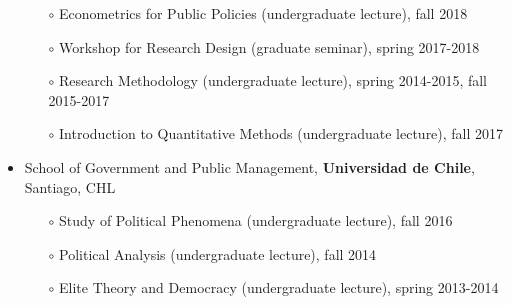 \begin{publications}
\begin{itemize}
\begin{itemize}
\item[$\circ$]{\small Econometrics for Public Policies (undergraduate lecture), fall 2018}
\item[$\circ$]{\small Workshop for Research Design (graduate seminar), spring 2017-2018}
\item[$\circ$]{\small Research Methodology (undergraduate lecture), spring 2014-2015, fall 2015-2017}
\item[$\circ$]{\small Introduction to Quantitative Methods (undergraduate lecture), fall 2017}
\end{itemize}
\item{\small School of Government and Public Management, {\bfseries Universidad de Chile}, Santiago, CHL}
\begin{itemize}
\item[$\circ$]{\small Study of Political Phenomena (undergraduate lecture), fall 2016}
\item[$\circ$]{\small Political Analysis (undergraduate lecture), fall 2014}
\item[$\circ$]{\small Elite Theory and Democracy (undergraduate lecture), spring 2013-2014}
\end{itemize}
\end{itemize}

\vspace{1mm}
\end{publications}
